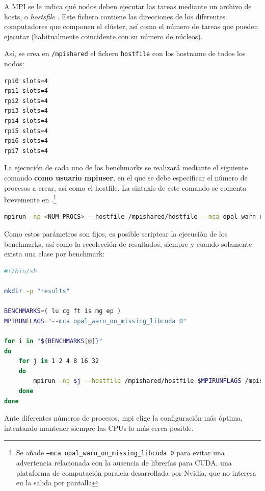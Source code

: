 A MPI se le indica qué nodos deben ejecutar las tareas mediante un archivo de hosts, o \textit{hostsfile} \cite{mpi_hostfile_option}. Este fichero contiene las direcciones de los diferentes computadores que componen el clúster, así como el número de tareas que pueden ejecutar (habitualmente coincidente con su número de núcleos).

Así, se crea en \texttt{/mpishared} el fichero \texttt{hostfile} con los hostname de todos los nodos:

\begin{lstlisting}[language=bash]
rpi0 slots=4
rpi1 slots=4
rpi2 slots=4
rpi3 slots=4
rpi4 slots=4
rpi5 slots=4
rpi6 slots=4
rpi7 slots=4
\end{lstlisting}

La ejecución de cada uno de los benchmarks se realizará mediante el siguiente comando \textbf{como usuario mpiuser}, en el que se debe especificar el número de procesos a crear, así como el hostfile. La sintaxis de este comando se comenta brevemente en .\footnote{Se añade \texttt{--mca opal\_warn\_on\_missing\_libcuda 0} para evitar una advertencia relacionada con la ausencia de librerías para CUDA, una plataforma de computación paralela desarrollada por Nvidia, que no interesa en la salida por pantalla}

\begin{lstlisting}[language=bash]
mpirun -np <NUM_PROCS> --hostfile /mpishared/hostfile --mca opal_warn_on_missing_libcuda 0 /mpishared/NPB3.4.2/NPB3.4-MPI/bin/<KERNEL>.<CLASS>.x
\end{lstlisting}

Como estos parámetros son fijos, es posible scriptear la ejecución de los benchmarks, así como la recolección de resultados, siempre y cuando solamente exista una clase por benchmark:

\begin{lstlisting}[language=bash]
#!/bin/sh

mkdir -p "results"

BENCHMARKS=( lu cg ft is mg ep )
MPIRUNFLAGS="--mca opal_warn_on_missing_libcuda 0"

for i in "${BENCHMARKS[@]}"
do
    for j in 1 2 4 8 16 32
    do
        mpirun -np $j --hostfile /mpishared/hostfile $MPIRUNFLAGS /mpishared/NPB3.4.2/NPB3.4-MPI/bin/${i}.*.x | tee -a results/$i.$j.run
    done
done
\end{lstlisting}

Ante diferentes números de procesos, \acrshort{mpi} elige la configuración más óptima, intentando mantener siempre las CPUs lo más cerca posible.

